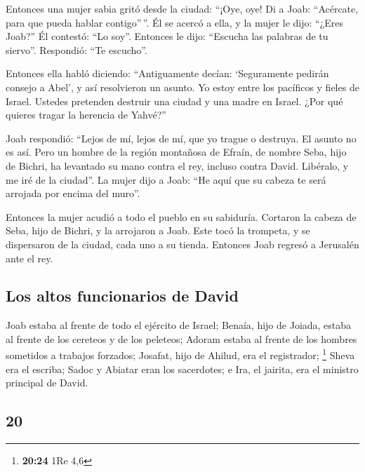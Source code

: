 \begin{paracol}{2}
 Entonces una mujer sabia gritó desde la ciudad: ``¡Oye,
oye! Di a Joab: ``Acércate, para que pueda hablar contigo''\,''.
 Él se acercó a ella, y la mujer le dijo: ``¿Eres Joab?''
Él contestó: ``Lo soy''. Entonces le dijo: ``Escucha las palabras de tu
siervo''. Respondió: ``Te escucho''.

 Entonces ella habló diciendo: ``Antiguamente decían:
`Seguramente pedirán consejo a Abel', y así resolvieron un asunto.
 Yo estoy entre los pacíficos y fieles de Israel. Ustedes
pretenden destruir una ciudad y una madre en Israel. ¿Por qué quieres
tragar la herencia de Yahvé?''

 Joab respondió: ``Lejos de mí, lejos de mí, que yo
trague o destruya.  El asunto no es así. Pero un hombre
de la región montañosa de Efraín, de nombre Seba, hijo de Bichri, ha
levantado su mano contra el rey, incluso contra David. Libéralo, y me
iré de la ciudad''. La mujer dijo a Joab: ``He aquí que su cabeza te
será arrojada por encima del muro''.

 Entonces la mujer acudió a todo el pueblo en su
sabiduría. Cortaron la cabeza de Seba, hijo de Bichri, y la arrojaron a
Joab. Este tocó la trompeta, y se dispersaron de la ciudad, cada uno a
su tienda. Entonces Joab regresó a Jerusalén ante el rey.

\hypertarget{los-altos-funcionarios-de-david}{%
\subsection{Los altos funcionarios de
David}\label{los-altos-funcionarios-de-david}}

 Joab estaba al frente de todo el ejército de Israel;
Benaía, hijo de Joiada, estaba al frente de los cereteos y de los
peleteos;  Adoram estaba al frente de los hombres
sometidos a trabajos forzados; Josafat, hijo de Ahilud, era el
registrador; \footnote{\textbf{20:24} 1Re 4,6}  Sheva era
el escriba; Sadoc y Abiatar eran los sacerdotes;  e Ira,
el jairita, era el ministro principal de David.

\switchcolumn
\begin{otherlanguage}{english}

\hypertarget{section-39}{%
\section{20}\label{section-39}}


\end{otherlanguage}
\end{paracol}
